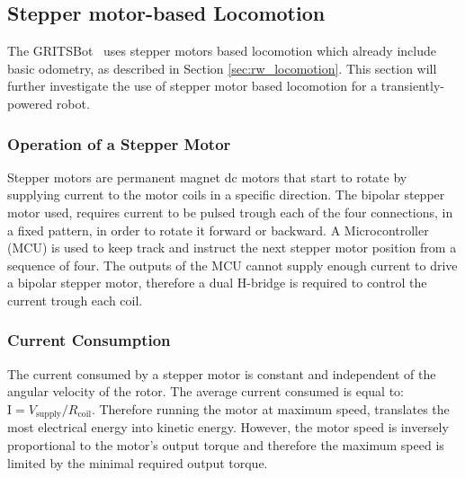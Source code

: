 \subsection{Stepper motor-based Locomotion}

The GRITSBot~\cite{pickem_icra_2015} uses stepper motors based locomotion which already include basic odometry, as described in Section \ref{sec:rw_locomotion}.
This section will further investigate the use of stepper motor based locomotion for a transiently-powered robot.

\subsubsection{Operation of a Stepper Motor}
Stepper motors are permanent magnet dc motors that start to rotate by supplying current to the motor coils in a specific direction.
The bipolar stepper motor used, requires current to be pulsed trough each of the four connections, in a fixed pattern, in order to rotate it forward or backward.
A Microcontroller (MCU) is used to keep track and instruct the next stepper motor position from a sequence of four.
The outputs of the MCU cannot supply enough current to drive a bipolar stepper motor, therefore a dual H-bridge is required to control the current trough each coil.


\subsubsection{Current Consumption}
The current consumed by a stepper motor is constant and independent of the angular velocity of the rotor.
The average current consumed is equal to: $\textrm{I} = V_{\text{supply}}/R_{\text{coil}}$.
Therefore running the motor at maximum speed, translates the most electrical energy into kinetic energy.
However, the motor speed is inversely proportional to the motor's output torque and therefore the maximum speed is limited by the minimal required output torque.

